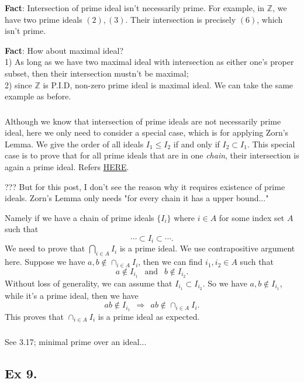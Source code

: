 \textbf{Fact}: Intersection of prime ideal isn't necessarily prime. For example, in $\mathbb Z$, we have two prime ideals $(2),(3)$. Their intersection is precisely $(6)$, which isn't prime.

\textbf{Fact}: How about maximal ideal?\\ 1) As long as we have two maximal ideal with intersection as either one's proper subset, then their intersection mustn't be maximal;\\ 2) since $\mathbb Z$ is P.I.D, non-zero prime ideal is maximal ideal. We can take the same example as before.

\subsubsection{}
Although we know that intersection of prime ideals are not necessarily prime ideal, here we only need to consider a special case, which is for applying Zorn's Lemma. We give the order of all ideals $I_1\leq I_2$ if and only if $I_2\subset I_1$. This special case is to prove that for all prime ideals that are in one \textit{chain}, their intersection is again a prime ideal. Refers \href{https://math.stackexchange.com/questions/944274/intersection-of-prime-ideals-in-a-chain-is-prime}{HERE}.

??? But for this post, I don't see the reason why it requires existence of prime ideals. Zorn's Lemma only needs "for every chain it has a upper bound..."

Namely if we have a chain of prime ideals $\{I_i\}$ where $i\in A$ for some index set $A$ such that 
$$\cdots\subset I_i\subset \cdots.$$ We need to prove that $\bigcap _{i\in A} I_i$ is a prime ideal. 
We use contrapositive argument here. Suppose we have $a,b\notin \cap _{i\in A}I_i$, then we can find $i_1,i_2\in A$ such that 
$$a\notin I_{i_1}~~\text{ and }~~ b\notin I_{i_2}.$$
Without loss of generality, we can assume that $I_{i_1}\subset I_{i_2}$. So we have $a,b\notin I_{i_1}$, while it's a prime ideal, then we have 
$$ab\notin I_{i_1} ~~ \Rightarrow ~~ ab\notin \cap _{i\in A}I_i.$$
This proves that $\cap _{i\in A} I_i$ is a prime ideal as expected.

\subsubsection{}

See \cite{altman} 3.17; minimal prime over an ideal...

\subsection{Ex 9.}

